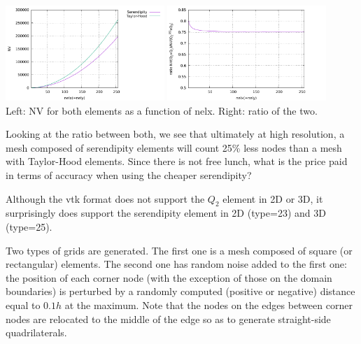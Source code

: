 \begin{center}
\includegraphics[width=6cm]{python_codes/fieldstone_52/images/NV.pdf}
\includegraphics[width=6cm]{python_codes/fieldstone_52/images/NV_ratio.pdf}\\
{\captionfont Left: NV for both elements as a function of nelx. Right: ratio of the 
two.}
\end{center}
Looking at the ratio between both, we see that ultimately 
at high resolution, a mesh composed of serendipity elements 
will count 25\% less nodes than a mesh with Taylor-Hood elements.
Since there is not free lunch, what is the price paid in terms of accuracy when using 
the cheaper serendipity? 

Although the vtk format does not support the $Q_2$ element in 2D or 3D, it surprisingly does
support the serendipity element in 2D (type=23) and 3D (type=25).

Two types of grids are generated. The first one is a mesh composed of square (or rectangular)
elements. The second one has random noise added to the first one: the position of each corner 
node (with the exception of those on the domain boundaries) is perturbed by a randomly computed 
(positive or negative) distance equal to $0.1h$ at the maximum. Note that the nodes
on the edges between corner nodes are relocated to the middle of the edge so as to generate
straight-side quadrilaterals.

